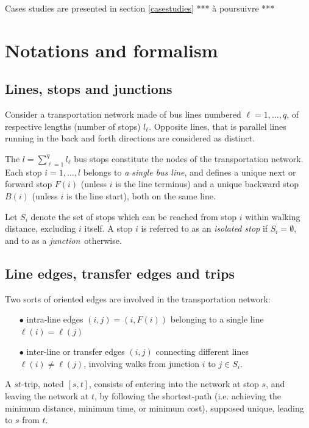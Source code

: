 \documentclass{bmcart}
\begin{document}
Cases studies are presented in section \ref{casestudies} *** à poursuivre *** 






\section{Notations and formalism}
\label{notforma}
\subsection{Lines, stops  and junctions}
\label{Lines and junctions}
Consider a transportation network made of bus lines numbered $\ell=1,\ldots, q$, of respective lengths (number of stops) $l_\ell$.  Opposite lines, that is parallel lines running in the back and forth directions are considered as distinct. 

The $l=\sum_{\ell=1}^ql_\ell$ bus stops constitute the nodes of the transportation network. Each stop $i=1,\ldots,l$ belongs to {\em  a single bus line}, and defines a unique next or forward stop $F(i)$ (unless $i$ is the line terminus) and a unique backward stop $B(i)$ (unless $i$ is the line start), both on the same line.  

Let $S_i$ denote the set of stops which can be reached from stop $i$ within walking distance, excluding $i$ itself. A stop $i$ is referred to as an {\em isolated stop} if $S_i=\emptyset$, and to as a {\em junction} otherwise. 


\subsection{Line edges, transfer edges and trips}
\label{Line edges, transfer edges and trips}
Two sorts of oriented edges are involved in the transportation network: 
\begin{enumerate}
  \item[$\bullet$] intra-line edges $(i,j)=(i,F(i))$ belonging to a single line  $\ell(i)=\ell(j)$
  \item[$\bullet$] inter-line or transfer edges $(i,j)$ connecting different lines $\ell(i)\neq \ell(j)$, involving walks from junction $i$ to $j\in S_i$.
  \end{enumerate}
A $st$-trip, noted $[s,t]$, consists of entering into the network at stop $s$, and leaving the network at $t$, by following the shortest-path (i.e. achieving the minimum distance,  minimum time, or  minimum cost), supposed unique, leading to $s$ from $t$. 
\end{document}
